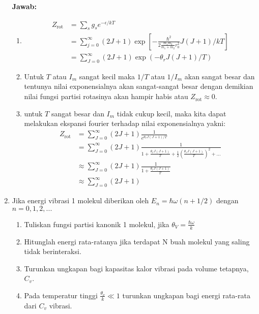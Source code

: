 \documentclass[a4paper , 12 pt]{article}
\begin{document}
\begin{enumerate}
\textbf{Jawab:}
\begin{enumerate}
\item 
\begin{align}
Z_\mathrm{rot} & = \sum_s  g_s e^{-\epsilon/ kT} \nonumber \\
& = \sum_{j = 0}^{\infty} (2J + 1)\exp  \left[ - \frac{\hbar^2}{2 \frac{m_1 m_2}{m_1 + m_2} r_0^2} J (J+1)/ kT\right] \nonumber \\
& = \sum_{J = 0}^{\infty} (2J + 1) \exp \left(-  \theta_r J(J +1)/T\right) \nonumber 
\end{align}
\item Untuk $T$ atau $I_m$ sangat  kecil maka $1/ T$ atau $1/ I_m$ akan sangat besar dan tentunya nilai exponensialnya akan sangat-sangat besar dengan demikian nilai fungsi partisi rotasinya akan hampir habis atau $Z_\mathrm{rot} \approx 0$.
\item untuk $T$ sangat besar dan $I_m $ tidak cukup kecil, maka kita dapat melakukan ekspansi fourier terhadap nilai exponensialnya yakni:
\begin{align}
Z_\mathrm{rot}& = \sum_{J = 0}^{\infty} (2 J + 1) \frac{1}{e^{\theta_r J(J+1)/ T}}\nonumber \\
&  =  \sum_{J = 0}^{\infty}  (2 J + 1) \frac{1}{1  + \frac{\theta_r J(J+1)}{T} + \frac{1}{2} \left(\frac{\theta_r J(J+1)}{T}\right)^2 + ...} \nonumber \\
& \approx \sum_{J=0}^{\infty} (2 J + 1) \frac{1}{{1  + \frac{\theta_r J(J+1)}{T}}} \nonumber \\
& \approx  \sum_{J=0}^{\infty} (2 J + 1)  \nonumber
\end{align}
\end{enumerate}
\item Jika energi vibrasi 1 molekul diberikan oleh $E_n = \hbar \omega (n+ 1/2) $ dengan $n = 0,1,2,...$ 
\begin{enumerate}
\item Tuliskan fungsi partisi kanonik 1 molekul, jika $ \theta_V = \frac{\hbar \omega}{k} $
\item Hitunglah energi rata-ratanya jika terdapat N buah molekul yang saling tidak berinteraksi. 
\item Turunkan ungkapan bagi kapasitas kalor vibrasi pada volume tetapnya, $C_v$. 
\item Pada temperatur tinggi $ \frac{\theta_\nu}{k} \ll 1$ turunkan ungkapan bagi energi rata-rata dari $C_v$ vibrasi. 

\end{enumerate}
\end{enumerate}
\end{document}
